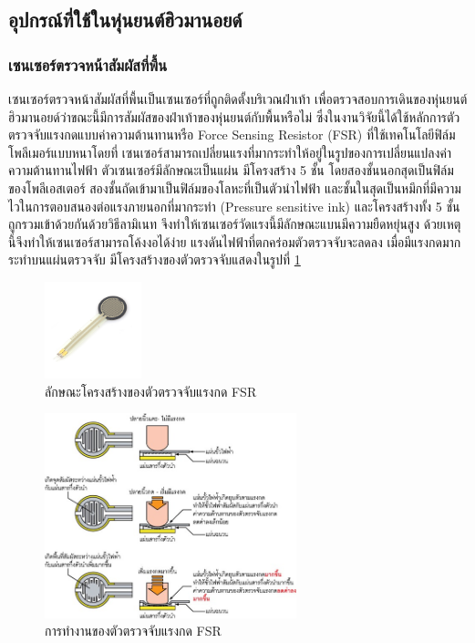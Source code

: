 \subsection{อุปกรณ์ที่ใช้ในหุ่นยนต์ฮิวมานอยด์}
\subsubsection{เซนเซอร์ตรวจหน้าสัมผัสที่พื้น}
เซนเซอร์ตรวจหน้าสัมผัสที่พื้นเป็นเซนเซอร์ที่ถูกติดตั้งบริเวณฝ่าเท้า เพื่อตรวจสอบการเดินของหุ่นยนต์ฮิวมานอยด์ว่าขณะนี้มีการสัมผัสของฝ่าเท้าของหุ่นยนต์กับพื้นหรือไม่
ซึ่งในงานวิจัยนี้ได้ใช้หลักการตัวตรวจจับแรงกดแบบค่าความต้านทานหรือ Force Sensing Resistor (FSR) ที่ใช้เทคโนโลยีฟิล์มโพลีเมอร์แบบหนาโดยที่
เซนเซอร์สามารถเปลี่ยนแรงที่มากระทำให้อยู่ในรูปของการเปลี่ยนแปลงค่าความต้านทานไฟฟ้า ตัวเซนเซอร์มีลักษณะเป็นแผ่น มีโครงสร้าง 5 ชั้น
โดยสองชั้นนอกสุดเป็นฟิล์มของโพลีเอสเตอร์ สองชั้นถัดเข้ามาเป็นฟิล์มของโลหะที่เป็นตัวนำไฟฟ้า และชั้นในสุดเป็นหมึกที่มีความไวในการตอบสนองต่อแรงภายนอกที่มากระทำ
(Pressure sensitive ink) และโครงสร้างทั้ง 5 ชั้น ถูกรวมเข้าด้วยกันด้วยวิธีลามิเนท จึงทำให้เซนเซอร์วัดแรงนี้มีลักษณะแบนมีความยืดหยุ่นสูง
ด้วยเหตุนี้จึงทำให้เซนเซอร์สามารถโค้งงอได้ง่าย แรงดันไฟฟ้าที่ตกคร่อมตัวตรวจจับจะลดลง เมื่อมีแรงกดมากระทำบนแผ่นตรวจจับ มีโครงสร้างของตัวตรวจจับแสดงในรูปที่ \ref{fig:fsr_sensor} 

\begin{figure}[H]
    \centering
    \includegraphics[width=0.25\textwidth]{chapter2/images/FSRx.jpg}
    \caption{ลักษณะโครงสร้างของตัวตรวจจับแรงกด FSR}
    \label{fig:fsr_sensor}
\end{figure}

\begin{figure}[H]
    \centering
    \includegraphics[width=0.65\textwidth]{chapter2/images/FSR.jpg}
    \caption{การทำงานของตัวตรวจจับแรงกด FSR}
    \label{fig:fsr_sensor_2}
\end{figure}

